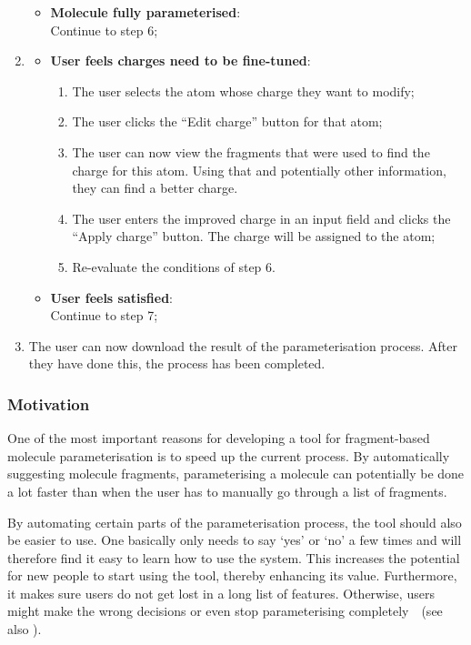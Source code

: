 \begin{enumerate}[itemsep=.1em, parsep=.2em, topsep=0em]
\begin{itemize}[leftmargin=0cm, itemsep=.1em, parsep=.1em]
  \item[] {\bf Molecule fully parameterised}:\\Continue to step 6;
  \end{itemize}
\item
  \begin{itemize}[leftmargin=0cm, itemsep=.1em, parsep=.1em]
  \item[] {\bf User feels charges need to be fine-tuned}:
    \begin{enumerate}
    \item The user selects the atom whose charge they want to modify;
    \item The user clicks the ``Edit charge'' button for that atom;
    \item The user can now view the fragments that were used to find the charge for this atom. Using that and potentially other information, they can find a better charge.
    \item The user enters the improved charge in an input field and clicks the ``Apply charge'' button. The charge will be assigned to the atom;
    \item Re-evaluate the conditions of step 6.
    \end{enumerate}
  \item[]{\bf User feels satisfied}:\\Continue to step 7;
  \end{itemize}
\item The user can now download the result of the parameterisation process. After they have done this, the process has been completed.
\end{enumerate}

\subsubsection{Motivation}
One of the most important reasons for developing a tool for fragment-based molecule parameterisation is to speed up the current process. By automatically suggesting molecule fragments, parameterising a molecule can potentially be done a lot faster than when the user has to manually go through a list of fragments.

By automating certain parts of the parameterisation process, the tool should also be easier to use. One basically only needs to say `yes' or `no' a few times and will therefore find it easy to learn how to use the system. This increases the potential for new people to start using the tool, thereby enhancing its value. Furthermore, it makes sure users do not get lost in a long list of features. Otherwise, users might make the wrong decisions or even stop parameterising completely~\cite{norman2002design}~(see also ).

